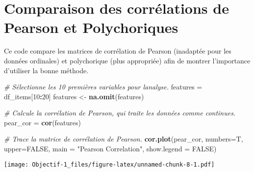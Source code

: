 \documentclass[
]{article}
\newenvironment{Shaded}{\begin{snugshade}}{\end{snugshade}}
\newcommand{\AttributeTok}[1]{\textcolor[rgb]{0.13,0.29,0.53}{#1}}
\newcommand{\CommentTok}[1]{\textcolor[rgb]{0.56,0.35,0.01}{\textit{#1}}}
\newcommand{\ConstantTok}[1]{\textcolor[rgb]{0.56,0.35,0.01}{#1}}
\newcommand{\DecValTok}[1]{\textcolor[rgb]{0.00,0.00,0.81}{#1}}
\newcommand{\FunctionTok}[1]{\textcolor[rgb]{0.13,0.29,0.53}{\textbf{#1}}}
\newcommand{\NormalTok}[1]{#1}
\newcommand{\OtherTok}[1]{\textcolor[rgb]{0.56,0.35,0.01}{#1}}
\newcommand{\SpecialCharTok}[1]{\textcolor[rgb]{0.81,0.36,0.00}{\textbf{#1}}}
\newcommand{\StringTok}[1]{\textcolor[rgb]{0.31,0.60,0.02}{#1}}
\begin{document}
\begin{Shaded}
\end{Shaded}

\section{Comparaison des corrélations de Pearson et
Polychoriques}\label{comparaison-des-corruxe9lations-de-pearson-et-polychoriques}

Ce code compare les matrices de corrélation de Pearson (inadaptée pour
les données ordinales) et polychorique (plus appropriée) afin de montrer
l'importance d'utiliser la bonne méthode.

\begin{Shaded}
\begin{Highlighting}[]
\CommentTok{\# Sélectionne les 10 premières variables pour l\textquotesingle{}analyse.}
\NormalTok{features }\OtherTok{=}\NormalTok{ df\_items[}\DecValTok{10}\SpecialCharTok{:}\DecValTok{20}\NormalTok{]}
\NormalTok{features }\OtherTok{\textless{}{-}} \FunctionTok{na.omit}\NormalTok{(features)}

\CommentTok{\# Calcule la corrélation de Pearson, qui traite les données comme continues.}
\NormalTok{pear\_cor }\OtherTok{=} \FunctionTok{cor}\NormalTok{(features)}

\CommentTok{\# Trace la matrice de corrélation de Pearson.}
\FunctionTok{cor.plot}\NormalTok{(pear\_cor, }\AttributeTok{numbers=}\NormalTok{T, }\AttributeTok{upper=}\ConstantTok{FALSE}\NormalTok{,  }\AttributeTok{main =} \StringTok{"Pearson Correlation"}\NormalTok{, }\AttributeTok{show.legend =} \ConstantTok{FALSE}\NormalTok{)}
\end{Highlighting}
\end{Shaded}

\texttt{[image: Objectif-1\_files/figure-latex/unnamed-chunk-8-1.pdf]}
\end{document}
